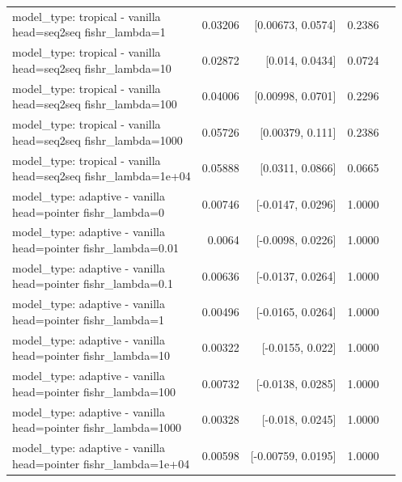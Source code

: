 \documentclass[10pt]{article}
\makeatletter
\newcommand{\stackcell}[1]{\begin{tabular}[t]{@{}l@{}}#1\end{tabular}}
\makeatother
\begin{document}
{\begin{longtable}{lrrrl}
\stackcell{model\_type: tropical - vanilla\\\footnotesize head=seq2seq fishr\_lambda=1 } & 0.03206 & [0.00673, 0.0574] & 0.2386 & \\
\stackcell{model\_type: tropical - vanilla\\\footnotesize head=seq2seq fishr\_lambda=10 } & 0.02872 & [0.014, 0.0434] & 0.0724 & \\
\stackcell{model\_type: tropical - vanilla\\\footnotesize head=seq2seq fishr\_lambda=100 } & 0.04006 & [0.00998, 0.0701] & 0.2296 & \\
\stackcell{model\_type: tropical - vanilla\\\footnotesize head=seq2seq fishr\_lambda=1000 } & 0.05726 & [0.00379, 0.111] & 0.2386 & \\
\stackcell{model\_type: tropical - vanilla\\\footnotesize head=seq2seq fishr\_lambda=1e+04 } & 0.05888 & [0.0311, 0.0866] & 0.0665 & \\
\stackcell{model\_type: adaptive - vanilla\\\footnotesize head=pointer fishr\_lambda=0 } & 0.00746 & [-0.0147, 0.0296] & 1.0000 & \\
\stackcell{model\_type: adaptive - vanilla\\\footnotesize head=pointer fishr\_lambda=0.01 } & 0.0064 & [-0.0098, 0.0226] & 1.0000 & \\
\stackcell{model\_type: adaptive - vanilla\\\footnotesize head=pointer fishr\_lambda=0.1 } & 0.00636 & [-0.0137, 0.0264] & 1.0000 & \\
\stackcell{model\_type: adaptive - vanilla\\\footnotesize head=pointer fishr\_lambda=1 } & 0.00496 & [-0.0165, 0.0264] & 1.0000 & \\
\stackcell{model\_type: adaptive - vanilla\\\footnotesize head=pointer fishr\_lambda=10 } & 0.00322 & [-0.0155, 0.022] & 1.0000 & \\
\stackcell{model\_type: adaptive - vanilla\\\footnotesize head=pointer fishr\_lambda=100 } & 0.00732 & [-0.0138, 0.0285] & 1.0000 & \\
\stackcell{model\_type: adaptive - vanilla\\\footnotesize head=pointer fishr\_lambda=1000 } & 0.00328 & [-0.018, 0.0245] & 1.0000 & \\
\stackcell{model\_type: adaptive - vanilla\\\footnotesize head=pointer fishr\_lambda=1e+04 } & 0.00598 & [-0.00759, 0.0195] & 1.0000 & \\

\end{longtable}}
\end{document}
